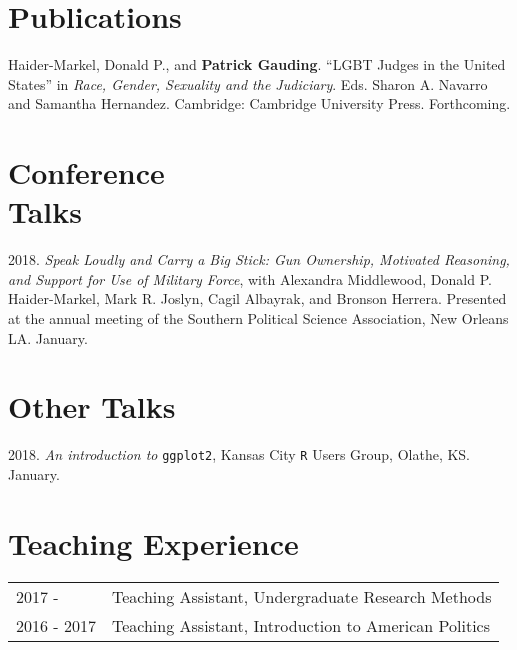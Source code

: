 \documentclass[margin,line,pifont,palatino,courier]{res}
\newenvironment{list1}{
  \begin{list}{\ding{113}}{%
      \setlength{\itemsep}{0in}
      \setlength{\parsep}{0in} \setlength{\parskip}{0in}
      \setlength{\topsep}{0in} \setlength{\partopsep}{0in}
      \setlength{\leftmargin}{0.17in}}}{\end{list}}
\newenvironment{list2}{
  \begin{list}{$\bullet$}{%
      \setlength{\itemsep}{0in}
      \setlength{\parsep}{0in} \setlength{\parskip}{0in}
      \setlength{\topsep}{0in} \setlength{\partopsep}{0in}
      \setlength{\leftmargin}{0.2in}}}{\end{list}}
\begin{document}
\begin{resume}
\begin{list1}

\end{list1}






\section{\sc Publications}

Haider-Markel, Donald P., and \textbf{Patrick Gauding}. ``LGBT Judges
in the United States'' in \textit{Race, Gender, Sexuality and the
  Judiciary}. Eds. Sharon A. Navarro  and Samantha
Hernandez. Cambridge: Cambridge University Press. Forthcoming.

\section{\sc Conference \\ Talks}

2018. \emph{Speak Loudly and Carry a Big Stick: Gun Ownership, Motivated
  Reasoning, and Support for Use of Military Force}, with Alexandra
Middlewood, Donald P. Haider-Markel, Mark R. Joslyn, Cagil Albayrak,
and Bronson Herrera. Presented at the annual meeting of the Southern
Political Science Association, New Orleans LA. January.

\section{\sc Other Talks}

2018. \emph{An introduction to} \verb+ggplot2+, Kansas City \verb+R+ Users Group,
Olathe, KS. January.



\section{\sc Teaching Experience}

\begin{tabular}{@{}p{0.8in}p{3.5in}}
  2017 -      & Teaching Assistant, Undergraduate Research Methods\\
  2016 - 2017 & Teaching Assistant, Introduction to American Politics\\
\end{tabular}




\end{resume}
\end{document}
